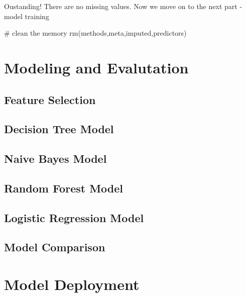 Oustanding! There are no missing values. Now we move on to the next part
- model training

\begin{Schunk}
\begin{Sinput}
# clean the memory
rm(methods,meta,imputed,predictors)
\end{Sinput}
\end{Schunk}

\hypertarget{modeling-and-evalutation}{%
\section{Modeling and Evalutation}\label{modeling-and-evalutation}}

\hypertarget{feature-selection}{%
\subsection{Feature Selection}\label{feature-selection}}

\hypertarget{decision-tree-model}{%
\subsection{Decision Tree Model}\label{decision-tree-model}}

\hypertarget{naive-bayes-model}{%
\subsection{Naive Bayes Model}\label{naive-bayes-model}}

\hypertarget{random-forest-model}{%
\subsection{Random Forest Model}\label{random-forest-model}}

\hypertarget{logistic-regression-model}{%
\subsection{Logistic Regression Model}\label{logistic-regression-model}}

\hypertarget{model-comparison}{%
\subsection{Model Comparison}\label{model-comparison}}

\hypertarget{model-deployment}{%
\section{Model Deployment}\label{model-deployment}}

